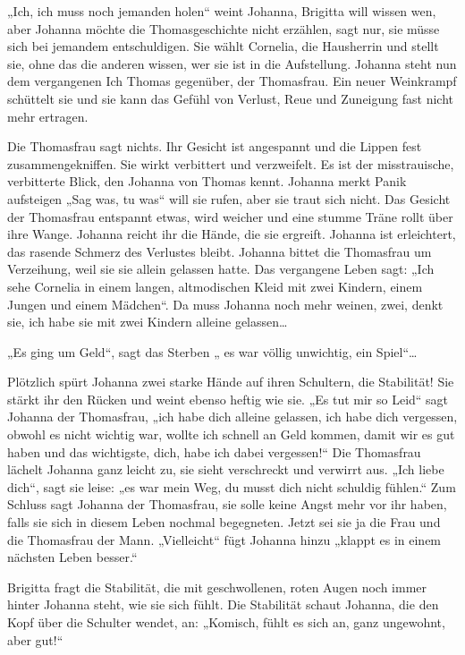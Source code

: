\documentclass[10pt,titlepage,a5paper]{book}
\begin{document}
„Ich, ich muss noch jemanden holen“ weint Johanna, Brigitta will wissen wen, aber Johanna möchte die Thomasgeschichte nicht erzählen, sagt nur, sie müsse sich bei jemandem entschuldigen. Sie wählt Cornelia, die Hausherrin und stellt sie, ohne das die anderen wissen, wer sie ist in die Aufstellung. Johanna steht nun dem vergangenen Ich Thomas gegenüber, der Thomasfrau. Ein neuer Weinkrampf schüttelt sie und sie kann das Gefühl von Verlust, Reue und Zuneigung fast nicht mehr ertragen.

Die Thomasfrau sagt nichts. Ihr Gesicht ist angespannt und die Lippen fest zusammengekniffen. Sie wirkt verbittert und verzweifelt. Es ist der misstrauische, verbitterte Blick, den Johanna von Thomas kennt. Johanna merkt Panik aufsteigen „Sag was, tu was“ will sie rufen, aber sie traut sich nicht. Das Gesicht der Thomasfrau entspannt etwas, wird weicher und eine stumme Träne rollt über ihre Wange. Johanna reicht ihr die Hände, die sie ergreift. Johanna ist erleichtert, das rasende Schmerz des Verlustes bleibt. Johanna bittet die Thomasfrau um Verzeihung, weil sie sie allein gelassen hatte.  Das vergangene Leben sagt: „Ich sehe Cornelia in einem langen, altmodischen Kleid mit zwei Kindern, einem Jungen und einem Mädchen“. Da muss Johanna noch mehr weinen, zwei, denkt sie, ich habe sie mit zwei Kindern alleine gelassen\dots 

„Es ging um Geld“, sagt das Sterben „ es war völlig unwichtig, ein Spiel“\dots 

Plötzlich spürt Johanna zwei starke Hände auf ihren Schultern, die Stabilität! Sie stärkt ihr den Rücken und weint ebenso heftig wie sie. „Es tut mir so Leid“  sagt Johanna der Thomasfrau, „ich habe dich alleine gelassen, ich habe dich vergessen, obwohl es nicht wichtig war, wollte ich schnell an Geld kommen, damit wir es gut haben und das wichtigste, dich, habe ich dabei vergessen!“ Die Thomasfrau lächelt Johanna ganz leicht zu, sie sieht verschreckt und verwirrt aus. „Ich liebe dich“, sagt sie leise: „es war mein Weg, du musst dich nicht schuldig fühlen.“ Zum Schluss sagt Johanna der Thomasfrau, sie solle keine Angst mehr vor ihr haben, falls sie sich in diesem Leben nochmal begegneten. Jetzt sei sie ja die Frau und die Thomasfrau der Mann. „Vielleicht“ fügt Johanna hinzu „klappt es in einem nächsten Leben besser.“ 

Brigitta fragt die Stabilität, die mit geschwollenen, roten Augen noch immer hinter Johanna steht, wie sie sich fühlt. Die Stabilität schaut Johanna, die den Kopf über die Schulter wendet, an: „Komisch, fühlt es sich an, ganz ungewohnt, aber gut!“
\end{document}
